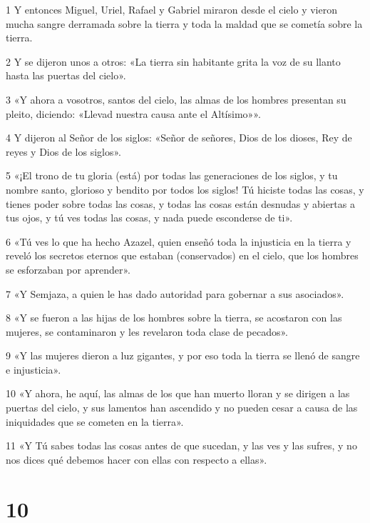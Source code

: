 \par 1 Y entonces Miguel, Uriel, Rafael y Gabriel miraron desde el cielo y vieron mucha sangre derramada sobre la tierra y toda la maldad que se cometía sobre la tierra.
\par 2 Y se dijeron unos a otros: «La tierra sin habitante grita la voz de su llanto hasta las puertas del cielo».
\par 3 «Y ahora a vosotros, santos del cielo, las almas de los hombres presentan su pleito, diciendo: «Llevad nuestra causa ante el Altísimo»».
\par 4 Y dijeron al Señor de los siglos: «Señor de señores, Dios de los dioses, Rey de reyes y Dios de los siglos».
\par 5 «¡El trono de tu gloria (está) por todas las generaciones de los siglos, y tu nombre santo, glorioso y bendito por todos los siglos! Tú hiciste todas las cosas, y tienes poder sobre todas las cosas, y todas las cosas están desnudas y abiertas a tus ojos, y tú ves todas las cosas, y nada puede esconderse de ti».
\par 6 «Tú ves lo que ha hecho Azazel, quien enseñó toda la injusticia en la tierra y reveló los secretos eternos que estaban (conservados) en el cielo, que los hombres se esforzaban por aprender».
\par 7 «Y Semjaza, a quien le has dado autoridad para gobernar a sus asociados».
\par 8 «Y se fueron a las hijas de los hombres sobre la tierra, se acostaron con las mujeres, se contaminaron y les revelaron toda clase de pecados».
\par 9 «Y las mujeres dieron a luz gigantes, y por eso toda la tierra se llenó de sangre e injusticia».
\par 10 «Y ahora, he aquí, las almas de los que han muerto lloran y se dirigen a las puertas del cielo, y sus lamentos han ascendido y no pueden cesar a causa de las iniquidades que se cometen en la tierra».
\par 11 «Y Tú sabes todas las cosas antes de que sucedan, y las ves y las sufres, y no nos dices qué debemos hacer con ellas con respecto a ellas».

\chapter{10}


